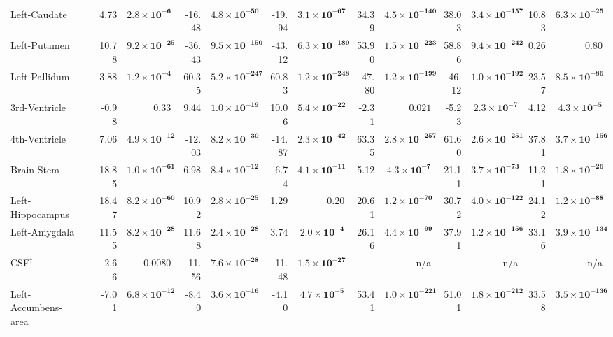 {\begin{longtable}{llrrrrrrrrrrrr}
Left-Caudate &  & 4.73 & $\mathbf{2.8{\times}10^{-6}}$ & -16.48 & $\mathbf{4.8{\times}10^{-50}}$ & -19.94 & $\mathbf{3.1{\times}10^{-67}}$ & 34.39 & $\mathbf{4.5{\times}10^{-140}}$ & 38.03 & $\mathbf{3.4{\times}10^{-157}}$ & 10.83 & $\mathbf{6.3{\times}10^{-25}}$ \\
Left-Putamen &  & 10.78 & $\mathbf{9.2{\times}10^{-25}}$ & -36.43 & $\mathbf{9.5{\times}10^{-150}}$ & -43.12 & $\mathbf{6.3{\times}10^{-180}}$ & 53.90 & $\mathbf{1.5{\times}10^{-223}}$ & 58.86 & $\mathbf{9.4{\times}10^{-242}}$ & 0.26 & $0.80$ \\
Left-Pallidum &  & 3.88 & $\mathbf{1.2{\times}10^{-4}}$ & 60.35 & $\mathbf{5.2{\times}10^{-247}}$ & 60.83 & $\mathbf{1.2{\times}10^{-248}}$ & -47.80 & $\mathbf{1.2{\times}10^{-199}}$ & -46.12 & $\mathbf{1.0{\times}10^{-192}}$ & 23.57 & $\mathbf{8.5{\times}10^{-86}}$ \\
3rd-Ventricle &  & -0.98 & $0.33$ & 9.44 & $\mathbf{1.0{\times}10^{-19}}$ & 10.06 & $\mathbf{5.4{\times}10^{-22}}$ & -2.31 & $0.021$ & -5.23 & $\mathbf{2.3{\times}10^{-7}}$ & 4.12 & $\mathbf{4.3{\times}10^{-5}}$ \\
4th-Ventricle &  & 7.06 & $\mathbf{4.9{\times}10^{-12}}$ & -12.03 & $\mathbf{8.2{\times}10^{-30}}$ & -14.87 & $\mathbf{2.3{\times}10^{-42}}$ & 63.35 & $\mathbf{2.8{\times}10^{-257}}$ & 61.60 & $\mathbf{2.6{\times}10^{-251}}$ & 37.81 & $\mathbf{3.7{\times}10^{-156}}$ \\
Brain-Stem &  & 18.85 & $\mathbf{1.0{\times}10^{-61}}$ & 6.98 & $\mathbf{8.4{\times}10^{-12}}$ & -6.74 & $\mathbf{4.1{\times}10^{-11}}$ & 5.12 & $\mathbf{4.3{\times}10^{-7}}$ & 21.11 & $\mathbf{3.7{\times}10^{-73}}$ & 11.21 & $\mathbf{1.8{\times}10^{-26}}$ \\
Left-Hippocampus &  & 18.47 & $\mathbf{8.2{\times}10^{-60}}$ & 10.92 & $\mathbf{2.8{\times}10^{-25}}$ & 1.29 & $0.20$ & 20.61 & $\mathbf{1.2{\times}10^{-70}}$ & 30.72 & $\mathbf{4.0{\times}10^{-122}}$ & 24.12 & $\mathbf{1.2{\times}10^{-88}}$ \\
Left-Amygdala &  & 11.55 & $\mathbf{8.2{\times}10^{-28}}$ & 11.68 & $\mathbf{2.4{\times}10^{-28}}$ & 3.74 & $\mathbf{2.0{\times}10^{-4}}$ & 26.16 & $\mathbf{4.4{\times}10^{-99}}$ & 37.91 & $\mathbf{1.2{\times}10^{-156}}$ & 33.16 & $\mathbf{3.9{\times}10^{-134}}$ \\
CSF$^{\dagger}$ &  & -2.66 & $0.0080$ & -11.56 & $\mathbf{7.6{\times}10^{-28}}$ & -11.48 & $\mathbf{1.5{\times}10^{-27}}$ &  & n/a &  & n/a &  & n/a \\
Left-Accumbens-area &  & -7.01 & $\mathbf{6.8{\times}10^{-12}}$ & -8.40 & $\mathbf{3.6{\times}10^{-16}}$ & -4.10 & $\mathbf{4.7{\times}10^{-5}}$ & 53.41 & $\mathbf{1.0{\times}10^{-221}}$ & 51.01 & $\mathbf{1.8{\times}10^{-212}}$ & 33.58 & $\mathbf{3.5{\times}10^{-136}}$ \\

\end{longtable}}
